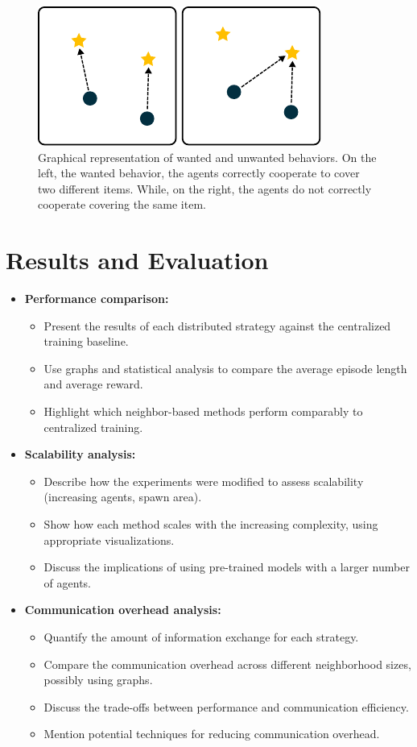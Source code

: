 \documentclass[sigconf]{acmart}
\begin{document}
\begin{figure}
  \centering
  \includegraphics[width=1\linewidth]{figures/behavior.pdf}
  \caption{Graphical representation of wanted and unwanted behaviors.
  On the left, the wanted behavior, the agents correctly cooperate to cover
  two different items.
  While, on the right, the agents do not correctly cooperate covering
  the same item.
  }
  \label{fig:behavior}
\end{figure}


\section{Results and Evaluation}\label{sec:results}
\begin{itemize}
\item \textbf{Performance comparison:}
\begin{itemize}
\item Present the results of each distributed strategy against the centralized training baseline.
\item Use graphs and statistical analysis to compare the average episode length and average reward.
\item Highlight which neighbor-based methods perform comparably to centralized training.
\end{itemize}
\item \textbf{Scalability analysis:}
\begin{itemize}
\item Describe how the experiments were modified to assess scalability (increasing agents, spawn area).
\item Show how each method scales with the increasing complexity, using appropriate visualizations.
\item Discuss the implications of using pre-trained models with a larger number of agents.
\end{itemize}
\item \textbf{Communication overhead analysis:}
\begin{itemize}
\item Quantify the amount of information exchange for each strategy.
\item Compare the communication overhead across different neighborhood sizes, possibly using graphs.
\item Discuss the trade-offs between performance and communication efficiency.
\item Mention potential techniques for reducing communication overhead.
\end{itemize}
\end{itemize}
\end{document}
